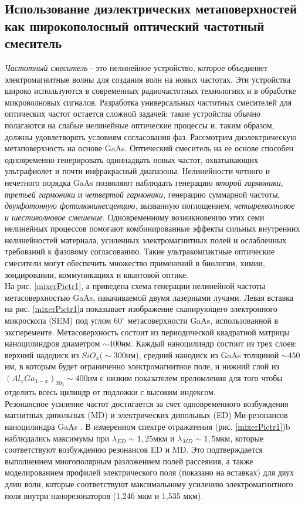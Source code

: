 \subsection*{Использование диэлектрических метаповерхностей как широкополосный оптический частотный смеситель}
\textit{Частотный смеситель} - это нелинейное устройство, которое объединяет электромагнитные волны для создания волн на новых частотах. Эти устройства широко используются в  современных радиочастотных технологиях и в обработке микроволновых сигналов. Разработка универсальных частотных смесителей для оптических частот остается сложной задачей: такие устройства обычно полагаются на слабые нелинейные оптические процессы и, таким образом, должны удовлетворять условиям согласования фаз. Рассмотрим диэлектрическую метаповерхность на основе GaAs. Оптический смеситель на ее основе способен одновременно генерировать одиннадцать новых частот, охватывающих ультрафиолет и почти инфракрасный диапазоны. Нелинейности четного и нечетного порядка GaAs позволяют наблюдать генерацию \textit{второй гармоники}, \textit{третьей гармоники} и \textit{четвертой гармоники}, генерацию суммарной частоты, \textit{двухфотонную фотолюминесценцию}, вызванную поглощением,\textit{ четырехволновое и шестиволновое смешение}. Одновременному возникновению этих семи нелинейных процессов помогают комбинированные эффекты сильных внутренних нелинейностей материала, усиленных электромагнитных полей и ослабленных требований к фазовому согласованию. Такие ультракомпактные оптические смесители могут обеспечить множество применений в биологии, химии, зондировании, коммуникациях и квантовой оптике.
\\
\hspace*{2mm}
На рис. \ref{mixerPictr1}, а приведена схема генерации нелинейной частоты метасоверхностью GaAs, накачиваемой двумя лазерными лучами. Левая вставка на рис. \ref{mixerPictr1}а показывает изображение сканирующего электронного микроскопа (SEM) под углом $60^\circ$ метасоверхности GaAs, использованной в эксперементе. Метасоверхность состоит из периодической квадратной матрицы наноцилиндров диаметром $\sim 400$нм. Каждый наноцилиндр состоит из трех слоев: верхний надодиск из $SiO_x (\sim 300 $нм), средний нанодиск из GaAs толщиной $\sim 450$нм, в которым будет ограниченно электромагнитное поле, и нижний слой из $(Al_xGa_{1 - x})_20_3 \sim 400$нм с низким показателем преломления  для того чтобы отделить всесь цилиндр от подложки  с высоким индексом.
\\
\hspace*{2mm}
Резонансное усиление частот достигается за счет одновременного  возбуждения магнитных дипольных (MD) и электрических дипольных (ED) Ми-резонансов наноцилиндра GaAs \cite{liu2016iii}. В измеренном спектре отражатения (рис. \ref{mixerPictr1})b наблюдались максимумы при $\lambda_{ED} \sim 1,25$мкм и $\lambda_{MD} \sim 1,5$мкм, которые соответствуют возбуждению резонансов ED и MD. Это  подтверждается выполнением многополярным разложением полей рассеяния, а также моделированием профилей электрического поля (показано на вставках) для двух длин волн, которые соответствуют максимальному усилению электромагнитного поля внутри нанорезонаторов (1,246 мкм и 1,535 мкм).
